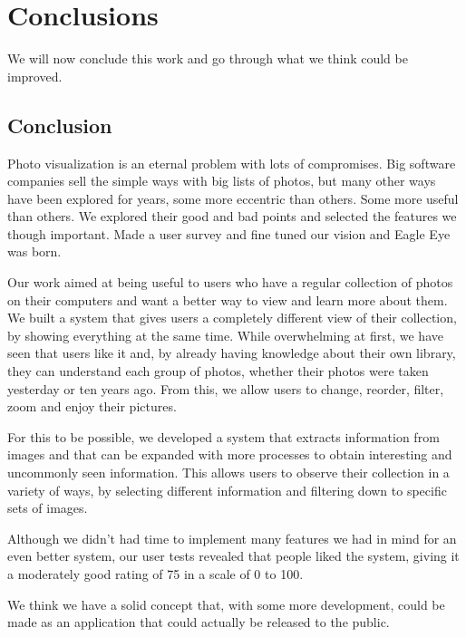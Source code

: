 \chapter{Conclusions}
\label{chapter:conclusions}

We will now conclude this work and go through what we think could be improved.



\section{Conclusion} %
\label{sec:conclusion}

Photo visualization is an eternal problem with lots of compromises. Big software companies sell the simple ways with big lists of photos, but many other ways have been explored for years, some more eccentric than others. Some more useful than others. We explored their good and bad points and selected the features we though important. Made a user survey and fine tuned our vision and Eagle Eye was born.

Our work aimed at being useful to users who have a regular collection of photos on their computers and want a better way to view and learn more about them. We built a system that gives users a completely different view of their collection, by showing everything at the same time. While overwhelming at first, we have seen that users like it and, by already having knowledge about their own library, they can understand each group of photos, whether their photos were taken yesterday or ten years ago. From this, we allow users to change, reorder, filter, zoom and enjoy their pictures.

For this to be possible, we developed a system that extracts information from images and that can be expanded with more processes to obtain interesting and uncommonly seen information. This allows  users to observe their collection in a variety of ways, by selecting different information and filtering down to specific sets of images.


Although we didn't had time to implement many features we had in mind for an even better system, our user tests revealed that people liked the system, giving it a moderately good rating of 75 in a scale of 0 to 100. 

We think we have a solid concept that, with some more development, could be made as an application that could actually be released to the public.






